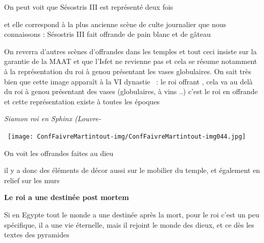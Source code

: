 \documentclass[a4paper]{article}
\begin{document}
\bigskip

{
On peut voit que Sésostris III est représenté deux fois }

{
et elle correspond à la plus ancienne scène de culte journalier que nous
connaissons : Sésostris III fait offrande de pain blanc et de gâteau}


\bigskip

{
On reverra d'autres scènes d'offrandes dans les temples et tout ceci
insiste sur la garantie de la MAAT et que l'Isfet ne revienne pas et
cela se résume notamment à la représentation du roi à genou présentant
les vases globulaires. On sait très bien que cette image apparaît à la
VI dynastie \ : le roi offrant , cela va au delà du roi à genou
présentant des vases (globulaires, à vins ..) c'est le roi en offrande
et cette représentation existe à toutes les époques}


\bigskip


\bigskip


\bigskip

{
\textit{Siamon roi en Sphinx (Louvre-}}

{
\ 
\texttt{[image: ConfFaivreMartintout-img/ConfFaivreMartintout-img044.jpg]}
}


\bigskip


\bigskip

{
On voit les offrandes faites au dieu}


\bigskip


\bigskip

{
il y a donc des éléments de décor aussi sur le mobilier du temple, et
également en relief sur les murs}


\bigskip


\bigskip


\bigskip


\bigskip

{
\textbf{Le roi a une destinée post mortem}}


\bigskip


\bigskip

{
Si en Egypte tout le monde a une destinée après la mort, pour le roi
c'est un peu spécifique, il a une vie éternelle, mais il rejoint le
monde des dieux, et ce dès les textes des pyramides}


\bigskip
\end{document}
